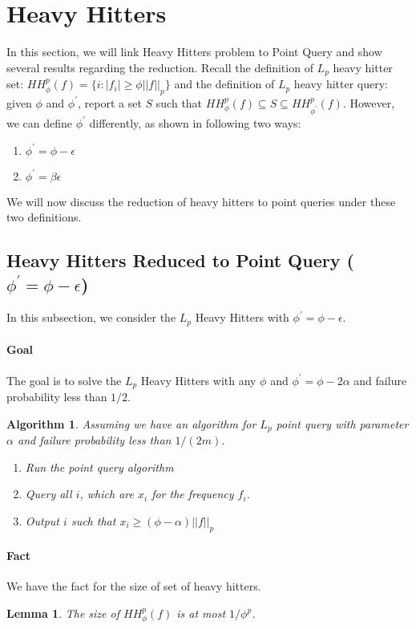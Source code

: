 \documentclass[11pt]{article}
\theoremstyle{plain}
\newtheorem{algorithm}{Algorithm}[section]
\newtheorem{lemma}[theorem]{Lemma}
\begin{document}
\section{Heavy Hitters}

In this section, we will link Heavy Hitters problem to Point Query and show 
several results regarding the reduction. Recall the definition of $L_p$ heavy 
hitter set: 
$HH_{\phi}^p(f)=\{i:|f_i|\geq \phi||f||_p\}$ and the definition of $L_p$ heavy 
hitter query:  
given $\phi$ and $\phi^{\prime}$, report a 
set $S$ such that $HH_{\phi}^p(f)\subseteq S \subseteq 
HH_{\phi^{\prime}}^p(f)$.  However, we can define $\phi^{\prime}$ differently, as 
shown in following two ways: \begin{enumerate}
	 \item $\phi^{\prime}=\phi-\epsilon$
	 \item  $\phi^{\prime}=\beta\epsilon$
\end{enumerate}
We will now discuss the reduction of heavy hitters to point queries under these 
two definitions. 

\subsection{Heavy Hitters Reduced to Point Query 
($\phi^{\prime}=\phi-\epsilon$)}
In this subsection, we consider the $L_p$ Heavy Hitters with 
$\phi^{\prime}=\phi-\epsilon$. 

\paragraph{Goal} The goal is to solve the $L_p$ Heavy Hitters with any $\phi$ 
and $\phi^{\prime}=\phi-2\alpha$ and failure probability less than $1/2$.

\begin{algorithm}
Assuming we have an algorithm for $L_p$ point query with parameter $\alpha$ 
and failure probability less than $1/(2m)$.
\begin{enumerate}
	\item Run the point query algorithm
	\item Query all $i$, which are $x_i$ for the frequency $f_i$.
	\item Output $i$ such that $x_i\geq (\phi-\alpha)||f||_p$
\end{enumerate}
\end{algorithm}

\paragraph{Fact}
We have the fact for the size of set of heavy hitters.
\begin{lemma}
\label{le:sizehh}
The size of $HH_{\phi}^p(f)$ is at most $1/\phi^p$. 
\end{lemma}
\end{document}
